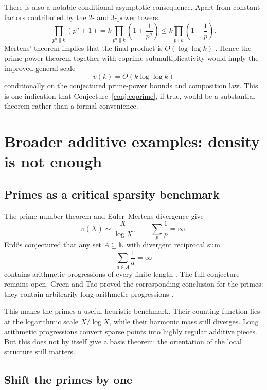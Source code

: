 \documentclass[../Axiomathic.tex]{subfiles}
\newcommand{\N}{\mathbb N}
\begin{document}
There is also a notable conditional asymptotic consequence.  Apart from constant factors contributed by the $2$- and $3$-power towers,
\[
  \prod_{p^a\parallel k}(p^a+1)
  =k\prod_{p^a\parallel k}\left(1+\frac1{p^a}\right)
  \le k\prod_{p\mid k}\left(1+\frac1p\right).
\]
Mertens' theorem implies that the final product is $O(\log\log k)$ \cite[Ch.~22]{HardyWright2008}.  Hence the prime-power theorem together with coprime submultiplicativity would imply the improved general scale
\begin{equation}\label{eq:kloglog}
  \boxed{v(k)=O(k\log\log k)}
\end{equation}
conditionally on the conjectured prime-power bounds and composition law.  This is one indication that Conjecture~\ref{conj:coprime}, if true, would be a substantial theorem rather than a formal convenience.

\section{Broader additive examples: density is not enough}

\subsection{Primes as a critical sparsity benchmark}

The prime number theorem and Euler--Mertens divergence give \cite[Chs.~22--23]{HardyWright2008}
\[
  \pi(X)\sim\frac{X}{\log X},
  \qquad
  \sum_p\frac1p=\infty.
\]
Erd\H{o}s conjectured that any set $A\subseteq\N$ with divergent reciprocal sum
\[
  \sum_{a\in A}\frac1a=\infty
\]
contains arithmetic progressions of every finite length \cite{Erdos1980}.  The full conjecture remains open.  Green and Tao proved the corresponding conclusion for the primes: they contain arbitrarily long arithmetic progressions \cite{GreenTao2008}.

This makes the primes a useful heuristic benchmark.  Their counting function lies at the logarithmic scale $X/\log X$, while their harmonic mass still diverges.  Long arithmetic progressions convert sparse points into highly regular additive pieces.  But this does not by itself give a basis theorem: the orientation of the local structure still matters.

\subsection{Shift the primes by one}
\end{document}
